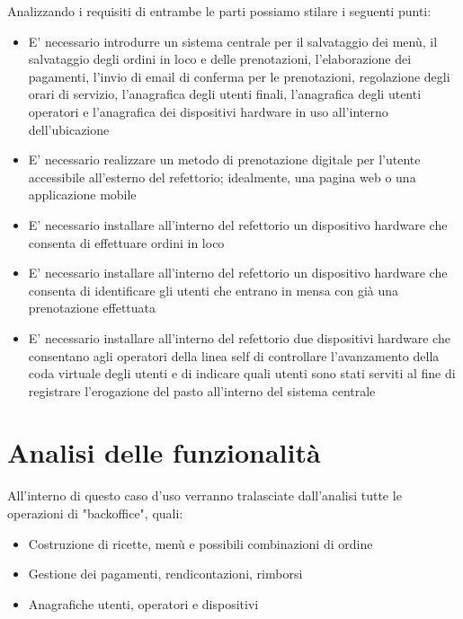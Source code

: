\documentclass[a4paper, titlepage, 12pt, openright, twoside]{book}
\begin{document}
Analizzando i requisiti di entrambe le parti possiamo stilare i seguenti punti:
\begin{itemize}
	\item E' necessario introdurre un sistema centrale per il salvataggio dei menù, il salvataggio degli ordini in loco e delle prenotazioni,
		  l'elaborazione dei pagamenti, l'invio di email di conferma per le prenotazioni, regolazione degli orari di servizio, l'anagrafica degli utenti finali, l'anagrafica degli
		  utenti operatori e l'anagrafica dei dispositivi hardware in uso all'interno dell'ubicazione
	\item E' necessario realizzare un metodo di prenotazione digitale per l'utente accessibile all'esterno del refettorio; idealmente, una pagina web o una applicazione mobile
	\item E' necessario installare all'interno del refettorio un dispositivo hardware che consenta di effettuare ordini in loco
	\item E' necessario installare all'interno del refettorio un dispositivo hardware che consenta di identificare gli utenti che entrano in mensa con già una prenotazione effettuata
	\item E' necessario installare all'interno del refettorio due dispositivi hardware che consentano agli operatori della linea self di controllare l'avanzamento della coda virtuale degli utenti e di indicare quali utenti sono stati serviti al fine di registrare l'erogazione del pasto all'interno del sistema centrale
\end{itemize}

\section{Analisi delle funzionalità}

All'interno di questo caso d'uso verranno tralasciate dall'analisi tutte le operazioni di "backoffice", quali:
\begin{itemize}
	\item Costruzione di ricette, menù e possibili combinazioni di ordine
	\item Gestione dei pagamenti, rendicontazioni, rimborsi
	\item Anagrafiche utenti, operatori e dispositivi
\end{itemize}
\end{document}
